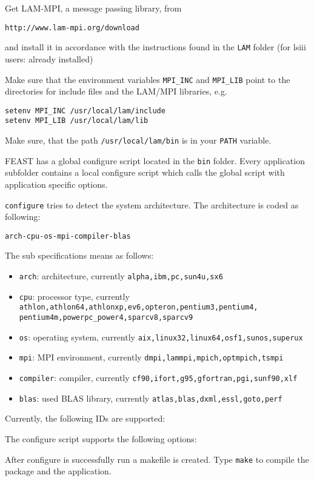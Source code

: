       
Get LAM-MPI, a message passing library, from

\verb+http://www.lam-mpi.org/download+

and install it in accordance with the instructions found
in the \verb+LAM+ folder (for lsiii users: already installed) \cite{BurnsDaoudVaigl1994,SquyresLumsdaine2003}

Make sure that the environment variables \verb+MPI_INC+ and 
\verb+MPI_LIB+ point to the directories for include files and the LAM/MPI libraries, e.g.

\begin{verbatim}
setenv MPI_INC /usr/local/lam/include
setenv MPI_LIB /usr/local/lam/lib
\end{verbatim}

Make sure, that the path \verb+/usr/local/lam/bin+ is in your 
\verb+PATH+ variable.


FEAST has a global configure script located in the \verb+bin+ folder. Every
application subfolder contains a local configure script which calls the
global script with application specific options. 

\verb+configure+ tries to detect the system architecture. The architecture is
coded as following:

\verb+arch-cpu-os-mpi-compiler-blas+

The sub specifications means as follows:
\begin{itemize}
\item \verb+arch+: architecture, currently \verb+alpha,ibm,pc,sun4u,sx6+
\item \verb+cpu+: processor type, currently \verb+athlon,athlon64,athlonxp,ev6,opteron,pentium3,pentium4,+\\
\verb+pentium4m,powerpc_power4,sparcv8,sparcv9+
\item \verb+os+: operating system, currently \verb+aix,linux32,linux64,osf1,sunos,superux+
\item \verb+mpi+: MPI environment, currently \verb+dmpi,lammpi,mpich,optmpich,tsmpi+
\item \verb+compiler+: compiler, currently \verb+cf90,ifort,g95,gfortran,pgi,sunf90,xlf+
\item \verb+blas+: used BLAS library, currently \verb+atlas,blas,dxml,essl,goto,perf+
\end{itemize}


Currently, the following IDs are supported:


The configure script supports the following options:


After configure is successfully run a makefile is created. Type \verb+make+
to compile the package and the application.

